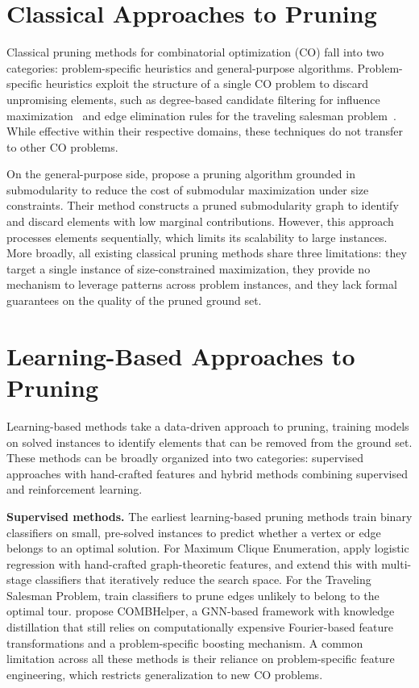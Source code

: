 \section{Classical Approaches to Pruning}
Classical pruning methods for combinatorial optimization (CO) fall into two categories:
problem-specific heuristics and general-purpose algorithms. Problem-specific heuristics
exploit the structure of a single CO problem to discard unpromising elements, such as
degree-based candidate filtering for influence
maximization~\citep{chen2010scalable} and edge elimination rules for the traveling
salesman problem~\citep{sun2021generalization}. While effective within their respective
domains, these techniques do not transfer to other CO problems.

On the general-purpose side, \citet{zhou2017scaling} propose a pruning algorithm grounded
in submodularity to reduce the cost of submodular maximization under size constraints.
Their method constructs a pruned submodularity graph to identify and discard elements with
low marginal contributions. However, this approach processes elements sequentially, which
limits its scalability to large instances. More broadly, all existing classical pruning
methods share three limitations: they target a single instance of size-constrained
maximization, they provide no mechanism to leverage patterns across problem instances, and
they lack formal guarantees on the quality of the pruned ground set.

\section{Learning-Based Approaches to Pruning}
Learning-based methods take a data-driven approach to pruning, training models on solved
instances to identify elements that can be removed from the ground set.
These methods can be broadly organized into two categories: supervised approaches with
hand-crafted features and hybrid methods combining supervised and reinforcement learning.

\textbf{Supervised methods.} The earliest learning-based pruning methods train binary classifiers on small, pre-solved
instances to predict whether a vertex or edge belongs to an optimal solution. For Maximum
Clique Enumeration, \citet{lauri2019fine} apply logistic regression with hand-crafted
graph-theoretic features, and \citet{grassia2019learning, lauri2023learning} extend this
with multi-stage classifiers that iteratively reduce the search space. For the Traveling
Salesman Problem, \citet{fitzpatrick2021learning, sun2021generalization} train classifiers
to prune edges unlikely to belong to the optimal tour. \citet{tian2024combhelper} propose
COMBHelper, a GNN-based framework with knowledge distillation that still relies on
computationally expensive Fourier-based feature transformations and a problem-specific
boosting mechanism. A common limitation across all
these methods is their reliance on problem-specific feature engineering, which restricts
generalization to new CO problems.

